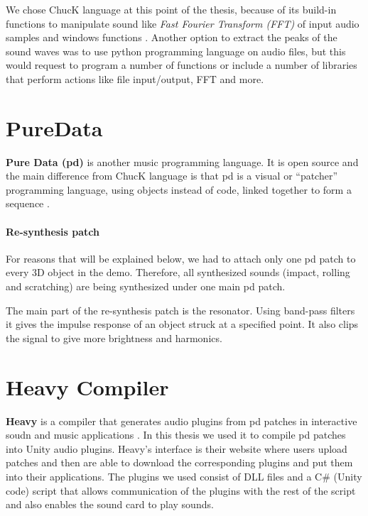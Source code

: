 We chose ChucK language at this point of the thesis, because of its build-in functions to manipulate sound like \textit{Fast Fourier Transform (FFT)} of input audio samples and windows functions \cite{bib:chuck_doc}. Another option to extract the peaks of the sound waves was to use python programming language on audio files, but this would request to program a number of functions or include a number of libraries that perform actions like file input/output, FFT and more. 

 
\section{PureData}
\textbf{Pure Data (pd)} is another music programming language. It is open source and the main difference from ChucK language is that pd is a visual or ``patcher'' programming language, using objects instead of code, linked together to form a sequence \cite{bib:pd}.

\paragraph{Re-synthesis patch\\}
For reasons that will be explained below, we had to attach only one pd patch to every 3D object in the demo. Therefore, all synthesized sounds (impact, rolling and scratching) are being synthesized under one main pd patch. 

The main part of the re-synthesis patch is the resonator. Using band-pass filters it gives the impulse response of an object struck at a specified point. It also clips the signal to give more brightness and harmonics. 

\section{Heavy Compiler}
\textbf{Heavy} is a compiler that generates audio plugins from pd patches in interactive soudn and music applications \cite{bib:heavy}. In this thesis we used it to compile pd patches into Unity audio plugins. Heavy's interface is their website where users upload patches and then are able to download the corresponding plugins and put them into their applications. The plugins we used consist of DLL files and a C\# (Unity code) script that allows communication of the plugins with the rest of the script and also enables the sound card to play sounds.

